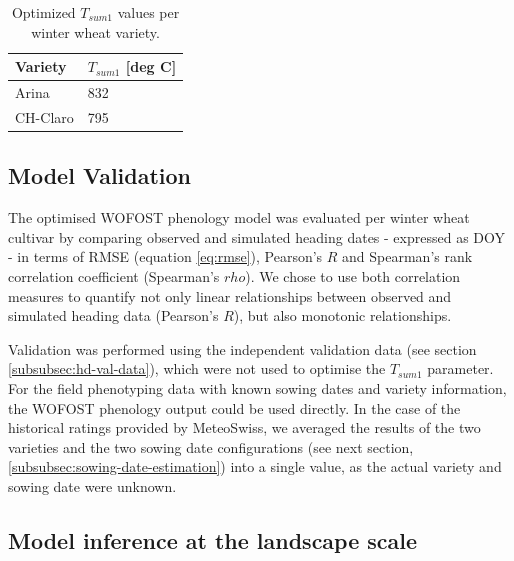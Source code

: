 \begin{table}[H]
\caption{Optimized $T_{sum1}$ values per winter wheat variety.}
\label{tab:tsum1-values}
\centering
\begin{tabular}{@{}ll@{}}
\toprule
Variety  & $T_{sum1}$ [deg C] \\ \midrule
Arina    & 832   \\
CH-Claro & 795   \\ \bottomrule
\end{tabular}
\end{table}

\subsection{Model Validation}
The optimised WOFOST phenology model was evaluated per winter wheat cultivar by comparing observed and simulated heading dates - expressed as \gls{DOY} - in terms of \gls{RMSE} (equation \ref{eq:rmse}), Pearson's $R$ and Spearman's rank correlation coefficient (Spearman's $rho$). We chose to use both correlation measures to quantify not only linear relationships between observed and simulated heading data (Pearson's $R$), but also monotonic relationships.

Validation was performed using the independent validation data (see section \ref{subsubsec:hd-val-data}), which were not used to optimise the $T_{sum1}$ parameter. For the field phenotyping data with known sowing dates and variety information, the WOFOST phenology output could be used directly. In the case of the historical ratings provided by MeteoSwiss, we averaged the results of the two varieties and the two sowing date configurations (see next section, \ref{subsubsec:sowing-date-estimation}) into a single value, as the actual variety and sowing date were unknown.

\subsection{Model inference at the landscape scale}

